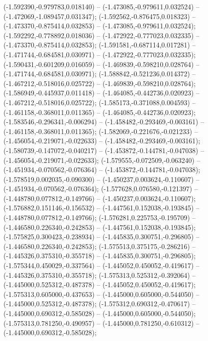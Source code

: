  (-1.592390,-0.979783,0.018140) -- (-1.473085,-0.979611,0.032524) -- (-1.472069,-1.089457,0.031347);
 (-1.592562,-0.876475,0.018323) -- (-1.473370,-0.875414,0.032853) -- (-1.473085,-0.979611,0.032524);
 (-1.592292,-0.778892,0.018036) -- (-1.472922,-0.777023,0.032335) -- (-1.473370,-0.875414,0.032853);
 (-1.591581,-0.687114,0.017281) -- (-1.471744,-0.684581,0.030971) -- (-1.472922,-0.777023,0.032335);
 (-1.590431,-0.601209,0.016059) -- (-1.469839,-0.598210,0.028764) -- (-1.471744,-0.684581,0.030971);
 (-1.588842,-0.521236,0.014372) -- (-1.467212,-0.518016,0.025722) -- (-1.469839,-0.598210,0.028764);
 (-1.586949,-0.445937,0.011418) -- (-1.464085,-0.442736,0.020923) -- (-1.467212,-0.518016,0.025722);
 (-1.585173,-0.371088,0.004593) -- (-1.461158,-0.368011,0.011365) -- (-1.464085,-0.442736,0.020923);
 (-1.583546,-0.296341,-0.006294) -- (-1.458482,-0.293469,-0.003161) -- (-1.461158,-0.368011,0.011365);
 (-1.582069,-0.221676,-0.021233) -- (-1.456054,-0.219071,-0.022633) -- (-1.458482,-0.293469,-0.003161);
 (-1.580739,-0.147072,-0.040217) -- (-1.453872,-0.144781,-0.047038) -- (-1.456054,-0.219071,-0.022633);
 (-1.579555,-0.072509,-0.063240) -- (-1.451934,-0.070562,-0.076364) -- (-1.453872,-0.144781,-0.047038);
 (-1.578519,0.002035,-0.090300) -- (-1.450237,0.003624,-0.110607) -- (-1.451934,-0.070562,-0.076364);
 (-1.577628,0.076580,-0.121397) -- (-1.448780,0.077812,-0.149766) -- (-1.450237,0.003624,-0.110607);
 (-1.576882,0.151146,-0.156532) -- (-1.447561,0.152038,-0.193845) -- (-1.448780,0.077812,-0.149766);
 (-1.576281,0.225753,-0.195709) -- (-1.446580,0.226340,-0.242853) -- (-1.447561,0.152038,-0.193845);
 (-1.575825,0.300423,-0.238934) -- (-1.445835,0.300751,-0.296805) -- (-1.446580,0.226340,-0.242853);
 (-1.575513,0.375175,-0.286216) -- (-1.445326,0.375310,-0.355718) -- (-1.445835,0.300751,-0.296805);
 (-1.575344,0.450029,-0.337564) -- (-1.445052,0.450052,-0.419617) -- (-1.445326,0.375310,-0.355718);
 (-1.575313,0.525312,-0.392064) -- (-1.445000,0.525312,-0.487378) -- (-1.445052,0.450052,-0.419617);
 (-1.575313,0.605000,-0.437653) -- (-1.445000,0.605000,-0.544050) -- (-1.445000,0.525312,-0.487378);
 (-1.575312,0.690312,-0.470617) -- (-1.445000,0.690312,-0.585028) -- (-1.445000,0.605000,-0.544050);
 (-1.575313,0.781250,-0.490957) -- (-1.445000,0.781250,-0.610312) -- (-1.445000,0.690312,-0.585028);
